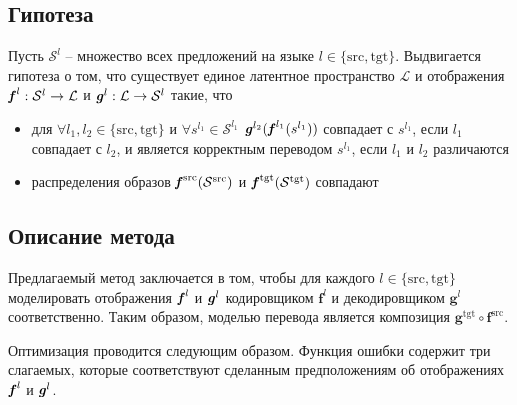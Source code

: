 \documentclass[12pt,twoside]{article}
\begin{document}
\subsection{Гипотеза}
   Пусть $\mathcal{S}^{l}$ -- множество всех предложений на языке $l \in \{\text{src}, \text{tgt}\}$. Выдвигается гипотеза о том, что существует единое латентное пространство $\mathcal{L}$ и отображения $\textbf{\textit{f}}^{l}: \mathcal{S}^{l} \to \mathcal{L}$ и $\textbf{\textit{g}}^{l}: \mathcal{L} \to \mathcal{S}^{l}$ такие, что 
   \begin{itemize}
      \item для $\forall l_1, l_2 \in \{\text{src}, \text{tgt}\}$ и $\forall s^{l_1} \in \mathcal{S}^{l_1}$ $\textbf{\textit{g}}^{l_2}(\textbf{\textit{f}}^{l_1}(s^{l_1}))$ совпадает с $s^{l_1}$, если $l_1$ совпадает с $l_2$, и является корректным переводом $s^{l_1}$, если $l_1$ и $l_2$ различаются
      
      
      \item распределения образов $\textbf{\textit{f}}^{\text{src}}(\mathcal{S}^{\text{src}})$ и $\textbf{\textit{f}}^{\text{tgt}}(\mathcal{S}^{\text{tgt}})$ совпадают
   \end{itemize}

\subsection{Описание метода}
   Предлагаемый метод заключается в том, чтобы для каждого $l \in \{\text{src}, \text{tgt}\}$  моделировать отображения $\textbf{\textit{f}}^{l}$ и $\textbf{\textit{g}}^{l}$ кодировщиком $\textbf{f}^{l}$ и декодировщиком $\textbf{g}^{l}$ соответственно. Таким образом, моделью перевода является композиция $\textbf{g}^{\text{tgt}} \circ \textbf{f}^{\text{src}}$. 
   
   Оптимизация проводится следующим образом. Функция ошибки содержит три слагаемых, которые соответствуют сделанным предположениям об отображениях $\textbf{\textit{f}}^{l}$ и $\textbf{\textit{g}}^{l}$.
\end{document}

